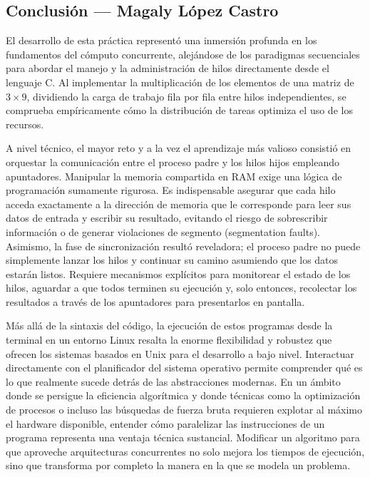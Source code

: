 \clearpage
\subsection{Conclusión — Magaly López Castro}
\label{sec:prac03:concl:magaly}

El desarrollo de esta práctica representó una inmersión profunda en los fundamentos del cómputo concurrente, alejándose de los paradigmas secuenciales para abordar el manejo y la administración de hilos directamente desde el lenguaje C. Al implementar la multiplicación de los elementos de una matriz de $3 \times 9$, dividiendo la carga de trabajo fila por fila entre hilos independientes, se comprueba empíricamente cómo la distribución de tareas optimiza el uso de los recursos. 

A nivel técnico, el mayor reto y a la vez el aprendizaje más valioso consistió en orquestar la comunicación entre el proceso padre y los hilos hijos empleando apuntadores. Manipular la memoria compartida en RAM exige una lógica de programación sumamente rigurosa. Es indispensable asegurar que cada hilo acceda exactamente a la dirección de memoria que le corresponde para leer sus datos de entrada y escribir su resultado, evitando el riesgo de sobrescribir información o de generar violaciones de segmento (segmentation faults). Asimismo, la fase de sincronización resultó reveladora; el proceso padre no puede simplemente lanzar los hilos y continuar su camino asumiendo que los datos estarán listos. Requiere mecanismos explícitos para monitorear el estado de los hilos, aguardar a que todos terminen su ejecución y, solo entonces, recolectar los resultados a través de los apuntadores para presentarlos en pantalla.

Más allá de la sintaxis del código, la ejecución de estos programas desde la terminal en un entorno Linux resalta la enorme flexibilidad y robustez que ofrecen los sistemas basados en Unix para el desarrollo a bajo nivel. Interactuar directamente con el planificador del sistema operativo permite comprender qué es lo que realmente sucede detrás de las abstracciones modernas. En un ámbito donde se persigue la eficiencia algorítmica y donde técnicas como la optimización de procesos o incluso las búsquedas de fuerza bruta requieren explotar al máximo el hardware disponible, entender cómo paralelizar las instrucciones de un programa representa una ventaja técnica sustancial. Modificar un algoritmo para que aproveche arquitecturas concurrentes no solo mejora los tiempos de ejecución, sino que transforma por completo la manera en la que se modela un problema.

